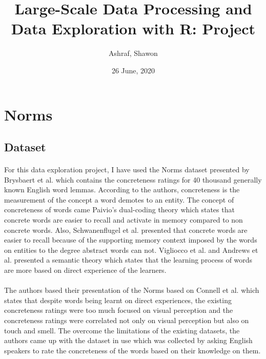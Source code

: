 \documentclass[11pt,a4paper]{article}
\begin{document}
\title{Large-Scale Data Processing and Data Exploration with R:
Project}
\author{Ashraf, Shawon}
\date{26 June, 2020}

\maketitle


\section{Norms}

\subsection{Dataset}

\paragraph{}
For this data exploration project, I have used the Norms dataset presented by Brysbaert et al. \cite{brys} which contains the concreteness ratings for 40 thousand generally known English word lemmas. According to the authors, concreteness is the measurement of the concept a word demotes to an entity. The concept of concreteness of words came Paivio’s dual-coding theory \cite{paivio} which states that concrete words are easier to recall and activate in memory compared to non concrete words. Also,  Schwanenflugel et al. \citep{schwanenflugel} presented that concrete words are easier to recall because of the supporting memory context imposed by the words on entities to the degree abstract words can not. Vigliocco et al. \cite{vigliocco_vinson_lewis_garrett_2004} and Andrews et al. \cite{andrews_vigliocco_vinson_2009} presented a semantic theory which states that the learning process of words are more based on direct experience of the learners.

\paragraph{}
The authors based their presentation of the Norms based on Connell et al. \cite{connell} which states that despite words being learnt on direct experiences, the existing concreteness ratings were too much focused on visual perception and the concreteness ratings were correlated not only on visual perception but also on touch and smell. The overcome the limitations of the existing datasets, the authors came up with the dataset in use which was collected by asking English speakers to rate the concreteness of the words based on their knowledge on them.
\end{document}
